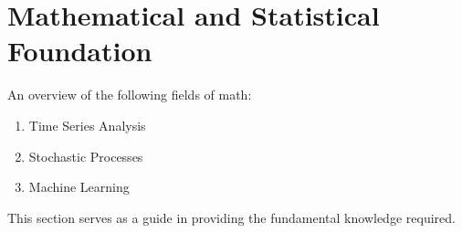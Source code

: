 \section{Mathematical and Statistical Foundation}

An overview of the following fields of math:
\begin{enumerate}[label=\roman*.]
\setlength{\itemsep}{0pt}
\item Time Series Analysis
\item Stochastic Processes
\item Machine Learning
\end{enumerate}

This section serves as a guide in providing the fundamental knowledge required.



\newpage



\newpage



